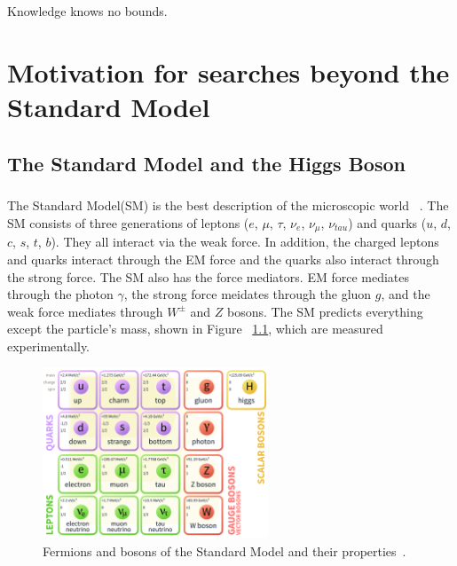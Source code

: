 \begin{savequote}[75mm]
Knowledge knows no bounds.
\end{savequote}

\chapter{Motivation for searches beyond the Standard Model}

\section{The Standard Model and the Higgs Boson}
\paragraph{}
The Standard Model(SM) is the best description of the microscopic world ~\cite{Griffiths,Tully,Pdg,Schwartz}. 
The SM consists of three generations of leptons ($e$, $\mu$, $\tau$, $\nu_e$, $\nu_{\mu}$, $\nu_{tau}$) and quarks ($u$, $d$, $c$, $s$, $t$, $b$).
They all interact via the weak force. In addition, the charged leptons and quarks interact through the EM force and the quarks also interact through the strong force.
The SM also has the force mediators. EM force mediates through the photon $\gamma$, the strong force meidates through the gluon $g$, and the weak force mediates through $W^{\pm}$ and $Z$ bosons.
The SM predicts everything except the particle's mass, shown in Figure ~\ref{fig:SM}, which are measured experimentally.

\begin{figure}[h!]
  \centering
  \captionsetup{justification=centering}
  \includegraphics[width=0.6\textwidth]{figures/theory/SM}
  \caption{Fermions and bosons of the Standard Model and their properties~\cite{Pdg}.}
  \label{fig:SM}
\end{figure}

